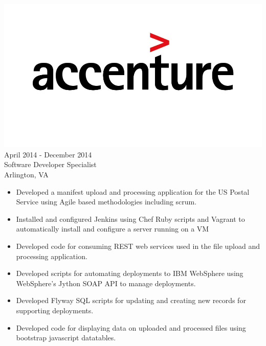 \documentclass[12pt, line, margin]{res}
\begin{document}
\begin{resume}
	      {\sl  \includegraphics[scale=0.1, trim=110 200 110 120]{resume_images/accenture-logo.jpg}} \hfill April 2014 - December 2014 \\
                Software Developer Specialist \\
                Arlington, VA
                 \begin{itemize}  \itemsep -2pt %
              \item   Developed a manifest upload and processing application for
			 the US Postal Service using Agile based methodologies including scrum.
              \item   Installed and configured Jenkins using Chef Ruby scripts and \newline
			 Vagrant to automatically install and configure a server running on a VM
	      \item   Developed code for consuming REST web services used
			 in the file upload and processing application.
	      \item   Developed scripts for automating deployments to IBM WebSphere
			 using WebSphere’s Jython SOAP API to manage deployments.
	      \item   Developed Flyway SQL scripts for updating and creating new 
			 records for supporting deployments.
	      \item   Developed code for displaying data on uploaded and processed
			 files using bootstrap javascript datatables.
                \end{itemize}


\end{resume}
\end{document}

